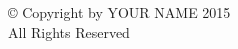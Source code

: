 
\thispagestyle{empty}

\vspace*{\fill}

\begin{center}
	© Copyright by YOUR NAME 2015\\
	All Rights Reserved
\end{center}

\vspace*{\fill}